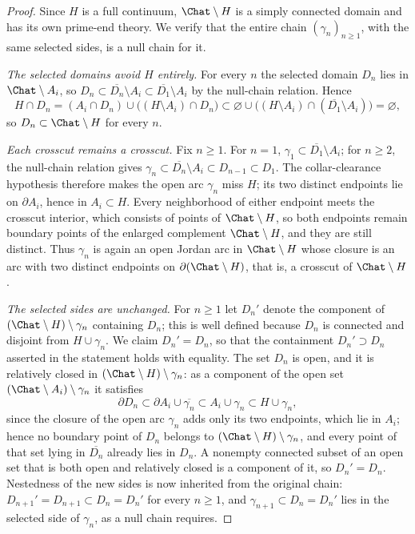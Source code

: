 \begin{proof}
Since $H$ is a full continuum, $\Chat\setminus H$ is a simply connected
domain and has its own prime-end theory.  We verify that the entire chain
$(\gamma_n)_{n\ge1}$, with the same selected sides, is a null chain for
it.

\emph{The selected domains avoid $H$ entirely.}
For every $n$ the selected domain $D_n$ lies in $\Chat\setminus A_i$, so
$D_n\subset\overline{D_n}\setminus A_i\subset
\overline{D_1}\setminus A_i$ by the null-chain relation.
Hence
\[
H\cap D_n
=(A_i\cap D_n)\cup\bigl((H\setminus A_i)\cap D_n\bigr)
\subset\varnothing\cup
\bigl((H\setminus A_i)\cap(\overline{D_1}\setminus A_i)\bigr)
=\varnothing,
\]
so $D_n\subset\Chat\setminus H$ for every $n$.

\emph{Each crosscut remains a crosscut.}
Fix $n\ge1$.  For $n=1$,
$\gamma_1\subset\overline{D_1}\setminus A_i$; for $n\ge2$, the
null-chain relation gives
$\gamma_n\subset\overline{D_n}\setminus A_i\subset D_{n-1}\subset D_1$.
The collar-clearance hypothesis therefore makes the open arc
$\gamma_n$ miss $H$; its two distinct
endpoints lie on $\partial A_i$, hence in $A_i\subset H$.  Every
neighborhood of either endpoint meets the crosscut interior, which
consists of points of $\Chat\setminus H$, so both endpoints remain
boundary points of the enlarged complement $\Chat\setminus H$, and they
are still distinct.  Thus $\gamma_n$ is again an open Jordan arc in
$\Chat\setminus H$ whose closure is an arc with two distinct endpoints on
$\partial(\Chat\setminus H)$, that is, a crosscut of $\Chat\setminus H$.

\emph{The selected sides are unchanged.}
For $n\ge1$ let $D_n'$ denote the component of
$(\Chat\setminus H)\setminus\gamma_n$ containing $D_n$; this is
well defined because $D_n$ is connected and disjoint from
$H\cup\gamma_n$.  We claim $D_n'=D_n$, so that the containment
$D_n'\supset D_n$ asserted in the statement holds with equality.  The
set $D_n$ is open, and it is relatively closed in
$(\Chat\setminus H)\setminus\gamma_n$: as a component of the open set
$(\Chat\setminus A_i)\setminus\gamma_n$ it satisfies
\[
\partial D_n
\subset\partial A_i\cup\overline{\gamma_n}
\subset A_i\cup\gamma_n
\subset H\cup\gamma_n,
\]
since the closure of the open arc $\gamma_n$ adds only its two
endpoints, which lie in $A_i$; hence no boundary point of $D_n$ belongs
to $(\Chat\setminus H)\setminus\gamma_n$, and every point of that set
lying in $\overline{D_n}$ already lies in $D_n$.  A nonempty connected
subset of an open set that is both open and relatively closed is a
component of it, so $D_n'=D_n$.  Nestedness of the new sides is now
inherited from the original chain:
$D_{n+1}'=D_{n+1}\subset D_n=D_n'$ for every $n\ge1$, and
$\gamma_{n+1}\subset D_n=D_n'$ lies in the selected side of $\gamma_n$,
as a null chain requires.


\end{proof}
